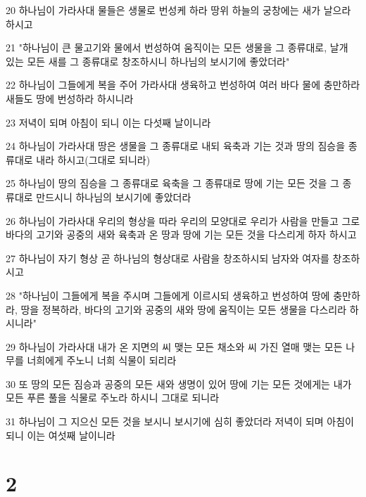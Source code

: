 \par 20 하나님이 가라사대 물들은 생물로 번성케 하라 땅위 하늘의 궁창에는 새가 날으라 하시고
\par 21 "하나님이 큰 물고기와 물에서 번성하여 움직이는 모든 생물을 그 종류대로, 날개 있는 모든 새를 그 종류대로 창조하시니 하나님의 보시기에 좋았더라"
\par 22 하나님이 그들에게 복을 주어 가라사대 생육하고 번성하여 여러 바다 물에 충만하라 새들도 땅에 번성하라 하시니라
\par 23 저녁이 되며 아침이 되니 이는 다섯째 날이니라
\par 24 하나님이 가라사대 땅은 생물을 그 종류대로 내되 육축과 기는 것과 땅의 짐승을 종류대로 내라 하시고(그대로 되니라)
\par 25 하나님이 땅의 짐승을 그 종류대로 육축을 그 종류대로 땅에 기는 모든 것을 그 종류대로 만드시니 하나님의 보시기에 좋았더라
\par 26 하나님이 가라사대 우리의 형상을 따라 우리의 모양대로 우리가 사람을 만들고 그로 바다의 고기와 공중의 새와 육축과 온 땅과 땅에 기는 모든 것을 다스리게 하자 하시고
\par 27 하나님이 자기 형상 곧 하나님의 형상대로 사람을 창조하시되 남자와 여자를 창조하시고
\par 28 "하나님이 그들에게 복을 주시며 그들에게 이르시되 생육하고 번성하여 땅에 충만하라, 땅을 정복하라, 바다의 고기와 공중의 새와 땅에 움직이는 모든 생물을 다스리라 하시니라"
\par 29 하나님이 가라사대 내가 온 지면의 씨 맺는 모든 채소와 씨 가진 열매 맺는 모든 나무를 너희에게 주노니 너희 식물이 되리라
\par 30 또 땅의 모든 짐승과 공중의 모든 새와 생명이 있어 땅에 기는 모든 것에게는 내가 모든 푸른 풀을 식물로 주노라 하시니 그대로 되니라
\par 31 하나님이 그 지으신 모든 것을 보시니 보시기에 심히 좋았더라 저녁이 되며 아침이 되니 이는 여섯째 날이니라

\chapter{2}

